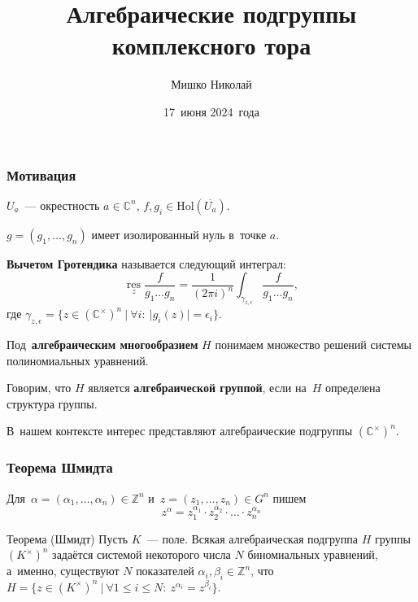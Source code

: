 \documentclass{beamer}
\title{Алгебраические подгруппы комплексного тора}
\author{Мишко Николай}
\institute{Сибирский федеральный университет\\Институт математики и фундаментальной информатики}
\date{17~июня 2024~года}
\newcommand{\Z}{\mathbb{Z}}
\begin{document}
\begin{frame}
  \titlepage
\end{frame}

\begin{frame}
  \frametitle{Мотивация}

  $U_a$~— окрестность $a \in \mathbb{C}^n$, $f, g_i \in \mathrm{Hol}(\overline{U_a})$.

  $g = (g_1, \ldots, g_n)$ имеет изолированный нуль в~точке $a$.

  \textbf{Вычетом Гротендика} называется следующий интеграл:
  $$
    \operatorname*{res}\limits_{z} \frac{f}{g_1 \ldots g_n} = \frac{1}{(2 \pi i)^n} \int_{\gamma_{z, \epsilon}} \frac{f}{g_1 \ldots g_n},
  $$
  где $\gamma_{z, \epsilon} = \{ z \in (\mathbb{C}^\times)^n\ | \ \forall i{:}\ |g_i(z)| = \epsilon_i \}$.

  Под~\textbf{алгебраическим многообразием} $H$ понимаем множество решений системы полиномиальных уравнений.

  Говорим, что $H$ является \textbf{алгебраической группой}, если на~$H$ определена структура группы.

  В~нашем контексте интерес представляют алгебраические подгруппы $(\mathbb{C}^\times)^n$.
\end{frame}

\begin{frame}
  \frametitle{Теорема Шмидта}

  Для~$\alpha = (\alpha_1, \ldots, \alpha_n) \in \Z^n$ и~$z = (z_1, \ldots, z_n) \in G^n$ пишем
  $$
    z^\alpha = z_1^{\alpha_1} \cdot z_2^{\alpha_2} \cdot \ldots \cdot z_n^{\alpha_n}
  $$

  \begin{block}{Теорема (Шмидт)}
    Пусть $K$~— поле. Всякая алгебраическая подгруппа $H$ группы $(K^{\times})^n$ задаётся
    системой некоторого числа $N$ биномиальных уравнений, а~именно, существуют $N$ показателей $\alpha_i, \beta_i \in \mathbb{Z}^n$, что
    $
        H = \{ z \in (K^{\times})^n\ |\ \forall 1 \leq i \leq N{:}\ z^{\alpha_i} = z^{\beta_i} \}.
    $
  \end{block}
\end{frame}
\end{document}

